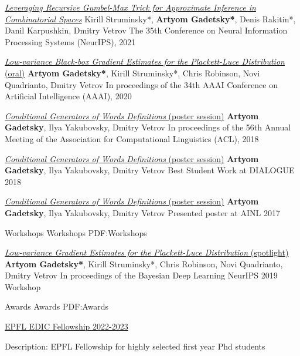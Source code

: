 \documentclass[letterpaper,MMMyyyy,nonstopmode]{simpleresumecv}
\begin{document}
\begin{Body}
\Item
\href{https://proceedings.neurips.cc/paper/2021/hash/5b658d2a925565f0755e035597f8d22f-Abstract.html}{\textit{Leveraging Recursive Gumbel-Max Trick for Approximate Inference in Combinatorial Spaces}}
\Item
Kirill Struminsky*, \textbf{Artyom Gadetsky*}, Denis Rakitin*, Danil Karpushkin, Dmitry Vetrov
\Item
The 35th Conference on Neural Information Processing Systems (NeurIPS), 2021

\Gap
\Item
\href{https://ojs.aaai.org/index.php/AAAI/article/view/6572}{\textit{Low-variance Black-box Gradient Estimates for the Plackett-Luce Distribution} (oral)}
\Item
\textbf{Artyom Gadetsky*}, Kirill Struminsky*, Chris Robinson, Novi Quadrianto, Dmitry Vetrov
\Item
In proceedings of the 34th AAAI Conference on Artificial Intelligence (AAAI), 2020

\Gap
\Item
\href{https://aclanthology.org/P18-2043/}{\textit{Conditional Generators of Words Definitions} (poster session)}
\Item
\textbf{Artyom Gadetsky}, Ilya Yakubovsky, Dmitry Vetrov
\Item
In proceedings of the 56th Annual Meeting of the \newline
Association for Computational Linguistics (ACL), 2018

\Gap
\Item
\href{http://www.dialog-21.ru/en/}{\textit{Conditional Generators of Words Definitions} (poster session)}
\Item
\textbf{Artyom Gadetsky}, Ilya Yakubovsky, Dmitry Vetrov
\Item
Best Student Work at DIALOGUE 2018

\Gap
\Item
\href{http://ainlconf.ru/2017}{\textit{Conditional Generators of Words Definitions} (poster session)}
\Item
\textbf{Artyom Gadetsky}, Ilya Yakubovsky, Dmitry Vetrov
\Item
Presented poster at AINL 2017

\Gap
\SubSection
{Workshops}
{Workshops}
{PDF:Workshops}

\Item
\href{http://bayesiandeeplearning.org/2019/}{\textit{Low-variance Gradient Estimates for the Plackett-Luce Distribution} (spotlight)}
\Item
\textbf{Artyom Gadetsky*}, Kirill Struminsky*, Chris Robinson, Novi Quadrianto, Dmitry Vetrov
\Item
In proceedings of the Bayesian Deep Learning NeurIPS 2019 Workshop

\Section
{Awards}
{Awards}
{PDF:Awards}

\BulletItem
\href{https://www.epfl.ch/education/phd/edic-computer-and-communication-sciences/edic-for-phd-students/}{EPFL EDIC Fellowship 2022-2023}
\begin{Detail}
\Item
Description: EPFL Fellowship for highly selected first year Phd students
\end{Detail}


\end{Body}
\end{document}
